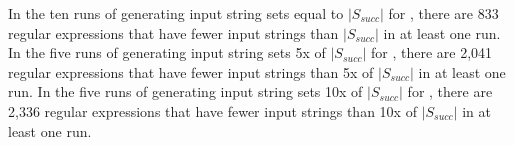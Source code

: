 In the ten runs of generating input string sets equal to $\lvert S_{succ} \rvert$ for \RexSOne, there are 833 regular expressions %
that have fewer input strings than $\lvert S_{succ} \rvert$ in at least one run. 
In the five runs of generating input string sets 5x of $\lvert S_{succ} \rvert$ for \RexSFive, there are 2,041 regular expressions %
that have fewer input strings than 5x of $\lvert S_{succ} \rvert$ in at least one run. In the five runs of generating input string sets 10x of $\lvert S_{succ} \rvert$ for \RexSTen, there are 2,336 regular expressions %
that have fewer input strings than 10x of $\lvert S_{succ} \rvert$ in at least one run.




